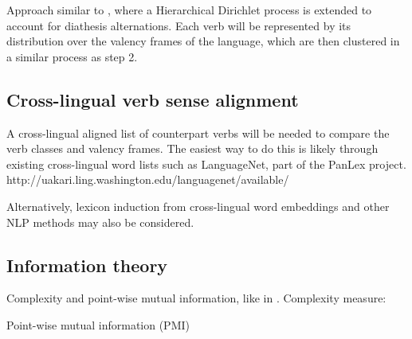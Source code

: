 Approach similar to \citet{parisien2010}, where a Hierarchical Dirichlet process is extended to account for diathesis alternations. Each verb will be represented by its distribution over the valency frames of the language, which are then clustered in a similar process as step 2.


\subsection{Cross-lingual verb sense alignment}\label{subsec:verblist}

A cross-lingual aligned list of counterpart verbs will be needed to compare the verb classes and valency frames. The easiest way to do this is likely through existing cross-lingual word lists such as LanguageNet, part of the PanLex project. http://uakari.ling.washington.edu/languagenet/available/

Alternatively, lexicon induction from cross-lingual word embeddings and other NLP methods may also be considered.

\subsection{Information theory}\label{subsec:infotheory}

Complexity and point-wise mutual information, like in \citet{say2014}.
Complexity measure:

Point-wise mutual information (PMI)